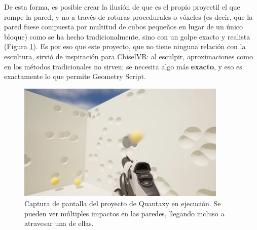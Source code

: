 De esta forma, es posible crear la ilusión de que es el propio proyectil el que rompe la pared, y no a través de roturas procedurales o vóxeles (es decir, que la pared fuese compuesta por multitud de cubos pequeños en lugar de un único bloque) como se ha hecho tradicionalmente, sino con un golpe exacto y realista (Figura \ref{fig:booleans_at_runtime}). Es por eso que este proyecto, que no tiene ninguna relación con la escultura, sirvió de inspiración para ChiselVR: al esculpir, aproximaciones como en los métodos tradicionales no sirven; se necesita algo más \textbf{exacto}, y eso es exactamente lo que permite Geometry Script.

\begin{figure}[H]
	\centering
	\includegraphics[width=10cm]{imagenes/booleans_at_runtime}
	\caption{Captura de pantalla del proyecto de Quantaxy en ejecución. Se pueden ver múltiples impactos en las paredes, llegando incluso a atravesar una de ellas.}
	\label{fig:booleans_at_runtime}
\end{figure}